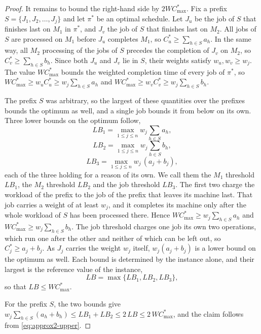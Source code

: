 \documentclass[12pt]{article}
\begin{document}
\begin{sloppypar}
\begin{proof}
It remains to bound the right-hand side by $2W C_{\max}^{*}$. Fix a prefix
$S=\{J_1,J_2,\dots,J_j\}$ and let $\pi^{*}$ be an optimal schedule. Let $J_u$ be the job of
$S$ that finishes last on $M_1$ in $\pi^{*}$, and $J_v$ the job of $S$ that finishes last on
$M_2$. All jobs of $S$ are processed on $M_1$ before $J_u$ completes $M_1$, so
$C^{*}_u\ge\sum_{h\in S}a_h$. In the same way, all $M_2$ processing of the jobs of $S$
precedes the completion of $J_v$ on $M_2$, so $C^{*}_v\ge\sum_{h\in S}b_h$.
Since both $J_u$ and $J_v$ lie in $S$, their weights satisfy $w_u,w_v\ge w_j$. The value
$W C_{\max}^{*}$ bounds the weighted completion time of every job of $\pi^{*}$, so
$W C_{\max}^{*}\ge w_u C^{*}_u\ge w_j\sum_{h\in S}a_h$ and
$W C_{\max}^{*}\ge w_v C^{*}_v\ge w_j\sum_{h\in S}b_h$.

The prefix $S$ was arbitrary, so the largest of these quantities over the prefixes bounds
the optimum as well, and a single job bounds it from below on its own. Three lower bounds
on the optimum follow,
\begin{equation}\label{eq:lb1}
LB_1=\max_{1\le j\le n}w_j\sum_{h\in S}a_h,
\end{equation}
\begin{equation}\label{eq:lb2}
LB_2=\max_{1\le j\le n}w_j\sum_{h\in S}b_h,
\end{equation}
\begin{equation}\label{eq:lb3}
LB_3=\max_{1\le j\le n}w_j\,(a_j+b_j),
\end{equation}
each of the three holding for a reason of its own. We call them the $M_1$ threshold $LB_1$,
the $M_2$ threshold $LB_2$ and the job threshold $LB_3$. The first two charge the workload of
the prefix to the job of the prefix that leaves its machine last. That job carries
a weight of at least $w_j$, and it completes its machine only after the whole workload of $S$
has been processed there. Hence $W C_{\max}^{*}\ge w_j\sum_{h\in S}a_h$ and
$W C_{\max}^{*}\ge w_j\sum_{h\in S}b_h$. The job threshold charges one job its own two
operations, which run one after the other and neither of which can be left out, so
$C^{*}_j\ge a_j+b_j$. As $J_j$ carries the weight $w_j$ itself, $w_j(a_j+b_j)$ is a lower
bound on the optimum as well. Each bound is determined by the instance alone, and their
largest is the reference value of the instance,
\begin{equation}\label{eq:lb}
LB=\max\{LB_1,LB_2,LB_3\},
\end{equation}
so that $LB\le W C_{\max}^{*}$.

For the prefix $S$, the two bounds give
$w_j\sum_{h\in S}(a_h+b_h)\le LB_1+LB_2\le 2\,LB\le 2\,W C_{\max}^{*}$, and the claim
follows from \cref{eq:approx2-upper}.
\end{proof}







\end{sloppypar}
\end{document}
